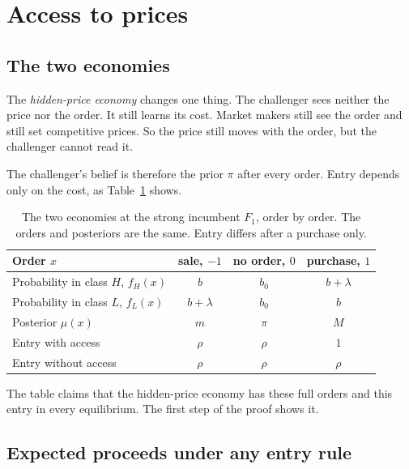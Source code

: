 \section{Access to prices}\label{sec:welfare-access}

\subsection{The two economies}\label{sec:welfare-twoeconomies}

The \emph{hidden-price economy} changes one thing. The challenger sees neither the price nor the order. It still
learns its cost. Market makers still see the order and still set competitive prices. So the price still moves with the
order, but the challenger cannot read it.

The challenger's belief is therefore the prior \(\pi\) after every order. Entry depends only on the cost, as
Table~\ref{tab:welfare-entry} shows.

\begin{table}[ht]
\centering
\begin{tabular}{@{}lccc@{}}
\toprule
Order \(x\) & sale, \(-1\) & no order, \(0\) & purchase, \(1\)\\
\midrule
Probability in class \(H\), \(f_H(x)\) & \(b\) & \(b_0\) & \(b+\lambda\)\\
Probability in class \(L\), \(f_L(x)\) & \(b+\lambda\) & \(b_0\) & \(b\)\\
Posterior \(\mu(x)\) & \(m\) & \(\pi\) & \(M\)\\
Entry with access & \(\rho\) & \(\rho\) & \(1\)\\
Entry without access & \(\rho\) & \(\rho\) & \(\rho\)\\
\bottomrule
\end{tabular}
\caption{The two economies at the strong incumbent \(F_1\), order by order. The orders and posteriors are the same.
Entry differs after a purchase only.}
\label{tab:welfare-entry}
\end{table}

The table claims that the hidden-price economy has these full orders and this entry in every equilibrium. The first
step of the proof shows it.

\subsection{Expected proceeds under any entry rule}\label{sec:welfare-proceeds}

